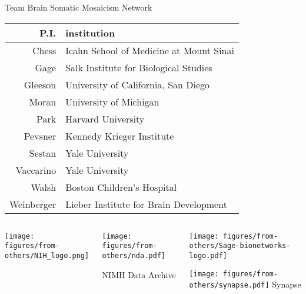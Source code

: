 \documentclass{beamer}
\begin{document}
\begin{frame}{Team}
Brain Somatic Mosaicism Network
\footnotesize
\begin{tabular}{rl}
\hline
P.I. & institution \\
\hline
\alert{Chess} & \alert{Icahn School of Medicine at Mount Sinai}\\
Gage & Salk Institute for Biological Studies\\
Gleeson & University of California, San Diego\\
Moran & University of Michigan\\
\alert{Park} & \alert{Harvard University}\\
Pevsner & Kennedy Krieger Institute\\
Sestan & Yale University\\
Vaccarino & Yale University\\
\alert{Walsh} & \alert{Boston Children's Hospital}\\
Weinberger & Lieber Institute for Brain Development\\
\end{tabular}
\vfill
\begin{columns}[t]
\begin{column}{0.3\textwidth}
\begin{center}

\texttt{[image: figures/from-others/NIH\_logo.png]}
\end{center}
\end{column}

\begin{column}{0.3\textwidth}
\begin{center}

\texttt{[image: figures/from-others/nda.pdf]}

NIMH Data Archive
\end{center}
\end{column}

\begin{column}{0.3\textwidth}
\begin{center}

\texttt{[image: figures/from-others/Sage-bionetworks-logo.pdf]}

\texttt{[image: figures/from-others/synapse.pdf]}
Synapse
\end{center}
\end{column}
\end{columns}
\end{frame}
\end{document}

